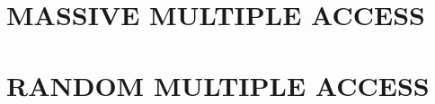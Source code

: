 \documentclass[12pt]{report}
\begin{document}
\renewcommand{\tamumanuscripttitle}{Applications of Coding Theory to Massive Multiple Access and Big Data Problems}

\renewcommand{\tamupapertype}{Dissertation}

\renewcommand{\tamufullname}{Avinash Vem}

\renewcommand{\tamudegree}{Doctor of Philosophy}
\renewcommand{\tamuchairone}{Krishna R. Narayanan}


\renewcommand{\tamumemberone}{Arun R. Srinivasa}
\newcommand{\tamumembertwo}{Jean-Francois Chamberland}
\newcommand{\tamumemberthree}{Alex Sprintson}
\renewcommand{\tamudepthead}{Miroslav M. Begovic}

\renewcommand{\tamugradmonth}{December}
\renewcommand{\tamugradyear}{2017}
\renewcommand{\tamudepartment}{Electrical Engineering}





%




%
\chapter{MASSIVE MULTIPLE ACCESS}
\label{chap:MAC}


\chapter{RANDOM MULTIPLE ACCESS}
\label{chap:uncoord_mac}

\end{document}
